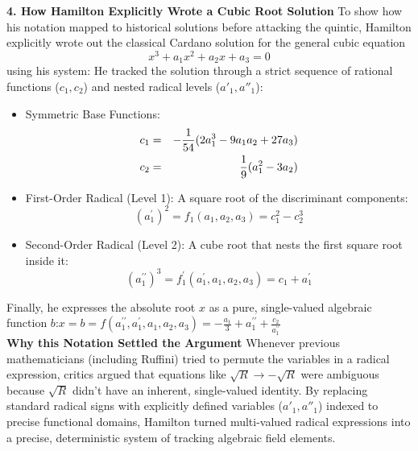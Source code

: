 {\bf 4. How Hamilton Explicitly Wrote a Cubic Root Solution}
To show how his notation mapped to historical solutions before attacking the quintic, Hamilton explicitly wrote out the classical Cardano solution for the general cubic equation
 \[x^3 + a_1 x^2 + a_2 x + a_3 = 0\] using his system:
He tracked the solution through a strict sequence of rational functions (\(c_1, c_2\)) and nested radical levels (\(a'_1, a''_1\)):
\begin{itemize}
\item[]Symmetric Base Functions:
\begin{eqnarray*}
c_{1} &=&-\frac{1}{54}(2a_{1}^{3}-9a_{1}a_{2}+27a_{3})\cr
c_{2} &=& \frac{1}{9}(a_{1}^{2}-3a_{2})
\end{eqnarray*}
\item[]First-Order Radical (Level 1): A square root of the discriminant components:\[(a_{1}^{\prime })^{2}=f_{1}(a_{1},a_{2},a_{3})=c_{1}^{2}-c_{2}^{3}\]
\item[]Second-Order Radical (Level 2): A cube root that nests the first square root inside it:\[(a_{1}^{\prime \prime })^{3}=f_{1}^{\prime }(a_{1}^{\prime },a_{1},a_{2},a_{3})=c_{1}+a_{1}^{\prime }\]
\end{itemize}


Finally, he expresses the absolute root \(x\) as a pure, single-valued algebraic function 
\(b\):\(x=b=f(a_{1}^{\prime \prime },a_{1}^{\prime },a_{1},a_{2},a_{3})=-\frac{a_{1}}{3}+a_{1}^{\prime \prime }+\frac{c_{2}}{a_{1}^{\prime \prime }}\) \\

{\bf Why this Notation Settled the Argument} 
Whenever previous mathematicians (including Ruffini) tried to permute the variables in a radical expression, critics argued that equations like \(\sqrt{R} \to -\sqrt{R}\) were ambiguous because \(\sqrt{R}\) didn't have an inherent, single-valued identity.
By replacing standard radical signs with explicitly defined variables (\(a'_1, a''_1\)) indexed to precise functional domains, Hamilton turned multi-valued radical expressions into a precise, deterministic system of tracking algebraic field elements.\\


